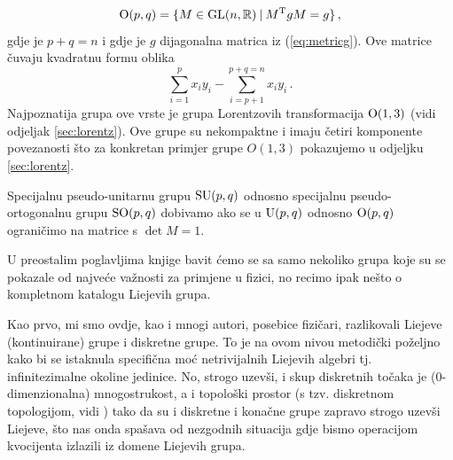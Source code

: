 \begin{enumerate}[leftmargin=0pt, itemindent=0pt]
\begin{equation}
\mathrm{O}(p, q) = \{ M\in \mathrm{GL}(n,\mathbb{R}) \: | \: M^{\mathrm{T}} g M = g \} \,,
\label{eq:MgM}
\end{equation}
gdje je $p+q=n$ i gdje je $g$ dijagonalna matrica iz (\ref{eq:metricg}).
Ove matrice čuvaju kvadratnu formu oblika
\begin{equation}
 \sum_{i=1}^{p} x_{i} y_{i} - \sum_{i=p+1}^{p+q=n} x_{i} y_i  \,.
\end{equation}
Najpoznatija grupa ove vrste je grupa Lorentzovih transformacija  $\mathrm{O}(1,3)$
  
(vidi odjeljak \ref{sec:lorentz}). Ove grupe su nekompaktne i imaju
četiri komponente povezanosti što za 
konkretan primjer grupe $O(1,3)$ pokazujemo u odjeljku \ref{sec:lorentz}.

Specijalnu pseudo-unitarnu grupu $\mathrm{SU}(p,q)$ odnosno specijalnu
pseudo-or\-to\-go\-nal\-nu
grupu $\mathrm{SO}(p,q)$ dobivamo ako se u $\mathrm{U}(p,q)$ odnosno $\mathrm{O}(p, q)$
ograničimo na matrice s $\det M = 1$.
 

\end{enumerate}


U preostalim poglavljima knjige bavit ćemo se sa samo nekoliko grupa
koje su se pokazale od najveće važnosti za primjene u fizici, no recimo
ipak nešto o kompletnom katalogu Liejevih grupa.

Kao prvo, mi smo ovdje, kao i mnogi autori, posebice fizičari, razlikovali
Liejeve (kontinuirane) grupe i diskretne grupe. To je na ovom nivou metodički
poželjno kako bi se istaknula specifična moć netrivijalnih Liejevih algebri tj. infinitezimalne
okoline jedinice. No, strogo uzevši, i skup diskretnih točaka je
(0-dimenzionalna) mnogostrukost, a i topološki prostor (s tzv. 
diskretnom topologijom, vidi \cite{Smolic:2024}) tako da su i diskretne
i konačne grupe zapravo strogo uzevši Liejeve, što nas onda spašava od
nezgodnih situacija gdje bismo operacijom kvocijenta izlazili
iz domene Liejevih grupa.

